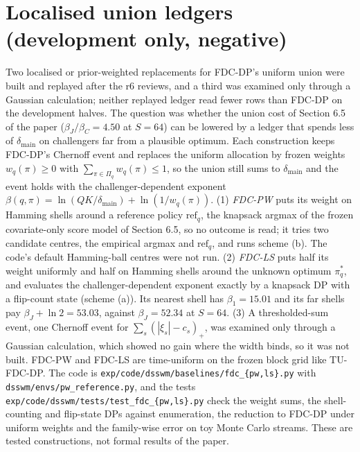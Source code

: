 \documentclass[sigconf,anonymous,review]{acmart}
\newcommand{\dmain}{\delta_{\text{main}}}
\begin{document}


\clearpage
\section{Localised union ledgers (development only, negative)}\label{app:localised}

Two localised or prior-weighted replacements for FDC-DP's uniform union were built and replayed after the r6 reviews, and a third was examined only through a Gaussian calculation; neither replayed ledger read fewer rows than FDC-DP on the development halves. The question was whether the union cost of Section 6.5 of the paper ($\beta_J/\beta_C = 4.50$ at $S = 64$) can be lowered by a ledger that spends less of $\dmain$ on challengers far from a plausible optimum. Each construction keeps FDC-DP's Chernoff event and replaces the uniform allocation by frozen weights $w_q(\pi) \ge 0$ with $\sum_{\pi \in \Pi_q} w_q(\pi) \le 1$, so the union still sums to $\dmain$ and the event holds with the challenger-dependent exponent $\beta(q,\pi) = \ln(QK/\dmain) + \ln(1/w_q(\pi))$. (1) \emph{FDC-PW} puts its weight on Hamming shells around a reference policy $\mathrm{ref}_q$, the knapsack argmax of the frozen covariate-only score model of Section 6.5, so no outcome is read; it tries two candidate centres, the empirical argmax and $\mathrm{ref}_q$, and runs scheme (b). The code's default Hamming-ball centres were not run. (2) \emph{FDC-LS} puts half its weight uniformly and half on Hamming shells around the unknown optimum $\pi^*_q$, and evaluates the challenger-dependent exponent exactly by a knapsack DP with a flip-count state (scheme (a)). Its nearest shell has $\beta_1 = 15.01$ and its far shells pay $\beta_J + \ln 2 = 53.03$, against $\beta_J = 52.34$ at $S = 64$. (3) A thresholded-sum event, one Chernoff event for $\sum_s (|\xi_s| - c_s)_+$, was examined only through a Gaussian calculation, which showed no gain where the width binds, so it was not built. FDC-PW and FDC-LS are time-uniform on the frozen block grid like TU-FDC-DP. The code is \texttt{exp/code/dsswm/baselines/fdc\_\{pw,ls\}.py} with \texttt{dsswm/envs/pw\_reference.py}, and the tests \texttt{exp/code/dsswm/tests/test\_fdc\_\{pw,ls\}.py} check the weight sums, the shell-counting and flip-state DPs against enumeration, the reduction to FDC-DP under uniform weights and the family-wise error on toy Monte Carlo streams. These are tested constructions, not formal results of the paper.


\end{document}
